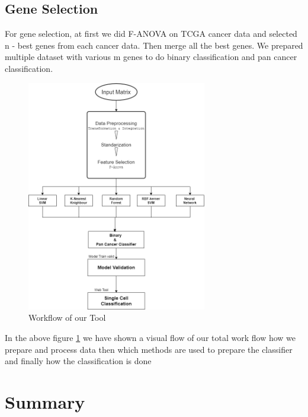 \subsection{Gene Selection}
For gene selection, at first we did F-ANOVA on TCGA cancer data and selected n - best genes from each cancer data. Then merge all the best genes. We prepared multiple dataset with various m genes to do binary classification and pan cancer classification. 
\begin{figure}[H]
    \centering
    \includegraphics[width=0.70\textwidth]{Workflow.png}
    \caption{Workflow of our Tool  }
    \label{fig:workflowfig}
\end{figure}
In the above figure \ref{fig:workflowfig} we have shown a visual flow of our total work flow how we prepare and process data then which methods are used to prepare the classifier and finally how the classification is done
\section{Summary}

